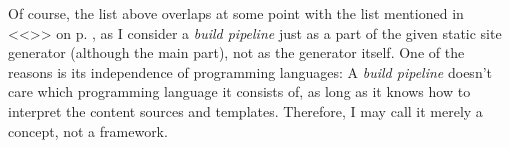 Of course, the list above overlaps at some point with the list mentioned in <<\emph{}>> on p. \pageref{par:creatingcontent}, as I consider a \emph{build pipeline} just as a part of the given static site generator (although the main part), not as the generator itself. One of the reasons is its independence of programming languages: A \emph{build pipeline} doesn't care which programming language it consists of, as long as it knows how to interpret the content sources and templates. Therefore, I may call it merely a concept, not a framework.




\vspace{20pt}



\vspace{20pt}


